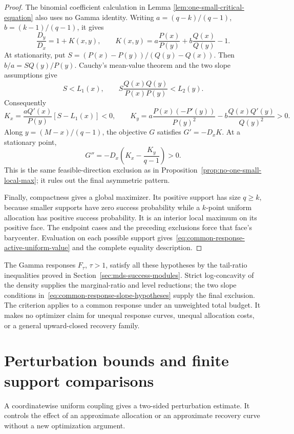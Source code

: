 \documentclass[11pt]{article}
\theoremstyle{definition}
\theoremstyle{remark}
\newcommand{\1}{\mathbf 1}
\begin{document}
\begin{proof}
The binomial coefficient calculation in Lemma
\ref{lem:one-small-critical-equation} also uses no Gamma identity.
Writing \(a=(q-k)/(q-1)\), \(b=(k-1)/(q-1)\), it gives
\[
 \frac{D_y}{D_x}=1+K(x,y),\qquad
 K(x,y)=a\frac{P(x)}{P(y)}+b\frac{Q(x)}{Q(y)}-1.
\]
At stationarity, put \(S=(P(x)-P(y))/(Q(y)-Q(x))\). Then
\(b/a=S Q(y)/P(y)\). Cauchy's mean-value theorem and the two
slope assumptions give
\[
 S<L_1(x),\qquad
 S\frac{Q(x)Q(y)}{P(x)P(y)}<L_2(y).
\]
Consequently
\[
 K_x=\frac{aQ'(x)}{P(y)}[S-L_1(x)]<0,
 \qquad
 K_y=a\frac{P(x)(-P'(y))}{P(y)^2}
       -b\frac{Q(x)Q'(y)}{Q(y)^2}>0.
\]
Along \(y=(M-x)/(q-1)\), the objective \(G\) satisfies
\(G'=-D_xK\). At a stationary point,
\[
 G''=-D_x\left(K_x-\frac{K_y}{q-1}\right)>0.
\]
This is the same feasible-direction exclusion as in
Proposition~\ref{prop:no-one-small-local-max}; it rules out the final
asymmetric pattern.

Finally, compactness gives a global maximizer.  Its positive support
has size \(q\ge k\), because smaller supports have zero success
probability while a \(k\)-point uniform allocation has positive
success probability.  It is an interior local maximum on its
positive face.  The endpoint cases and the preceding exclusions
force that face's barycenter.  Evaluation on each possible support
gives~\eqref{eq:common-response-active-uniform-value} and the complete
equality description.
\end{proof}

The Gamma responses \(F_\tau\), \(\tau>1\), satisfy all these
hypotheses by the tail-ratio inequalities proved in
Section~\ref{sec:mds-success-modules}.  Strict log-concavity of the
density supplies the marginal-ratio and level reductions; the two
slope conditions in~\eqref{eq:common-response-slope-hypotheses}
supply the final exclusion.  The criterion applies to a common
response under an unweighted total budget.  It makes no optimizer
claim for unequal response curves, unequal allocation costs, or a
general upward-closed recovery family.

\section{Perturbation bounds and finite support comparisons}\label{sec:perturbation}

A coordinatewise uniform coupling gives a two-sided perturbation estimate.  It
controls the effect of an approximate allocation or an approximate
recovery curve without a new optimization argument.
\end{document}
